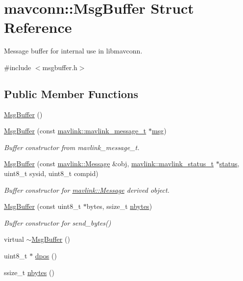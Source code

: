 \hypertarget{structmavconn_1_1MsgBuffer}{}\section{mavconn\+::Msg\+Buffer Struct Reference}
\label{structmavconn_1_1MsgBuffer}


Message buffer for internal use in libmavconn.  




{\ttfamily \#include $<$msgbuffer.\+h$>$}

\subsection*{Public Member Functions}
\begin{DoxyCompactItemize}
\item 
\mbox{\hyperlink{group__mavconn_ga64da82fdf707ca5304fda5e686fe4f11}{Msg\+Buffer}} ()
\item 
\mbox{\hyperlink{group__mavconn_ga202de878cea6b3fff8f8ef8c7f001cd5}{Msg\+Buffer}} (const \mbox{\hyperlink{include__v0_89_2mavlink__types_8h_a63b963764c09dc72f4910c1521e325b9}{mavlink\+::mavlink\+\_\+message\+\_\+t}} $\ast$\mbox{\hyperlink{stratnode_8cpp_a82cfe4ed9bc9e1b07c8bf209c324d85b}{msg}})
\begin{DoxyCompactList}\small\item\em Buffer constructor from mavlink\+\_\+message\+\_\+t. \end{DoxyCompactList}\item 
\mbox{\hyperlink{group__mavconn_ga8bcb63913aa131f1c054dc1e18a4d945}{Msg\+Buffer}} (const \mbox{\hyperlink{structmavlink_1_1Message}{mavlink\+::\+Message}} \&obj, \mbox{\hyperlink{include__v2_80_2mavlink__types_8h_aec6f7af3879252822d8fb108e97aafc2}{mavlink\+::mavlink\+\_\+status\+\_\+t}} $\ast$\mbox{\hyperlink{keyTalker_8cpp_a6e27f49150e9a14580fb313cc2777e00}{status}}, uint8\+\_\+t sysid, uint8\+\_\+t compid)
\begin{DoxyCompactList}\small\item\em Buffer constructor for \mbox{\hyperlink{structmavlink_1_1Message}{mavlink\+::\+Message}} derived object. \end{DoxyCompactList}\item 
\mbox{\hyperlink{group__mavconn_ga4555922debc003d9ba989aded6714fb5}{Msg\+Buffer}} (const uint8\+\_\+t $\ast$bytes, ssize\+\_\+t \mbox{\hyperlink{group__mavconn_ga564c27473f42c6cea687c8b5bbbb1621}{nbytes}})
\begin{DoxyCompactList}\small\item\em Buffer constructor for send\+\_\+bytes() \end{DoxyCompactList}\item 
virtual \mbox{\hyperlink{group__mavconn_gac56cac6705c915b3c74c3d0b12c45939}{$\sim$\+Msg\+Buffer}} ()
\item 
uint8\+\_\+t $\ast$ \mbox{\hyperlink{group__mavconn_ga0c971b3c0d8d540ccaf7e1929a5ecf07}{dpos}} ()
\item 
ssize\+\_\+t \mbox{\hyperlink{group__mavconn_ga564c27473f42c6cea687c8b5bbbb1621}{nbytes}} ()
\end{DoxyCompactItemize}
